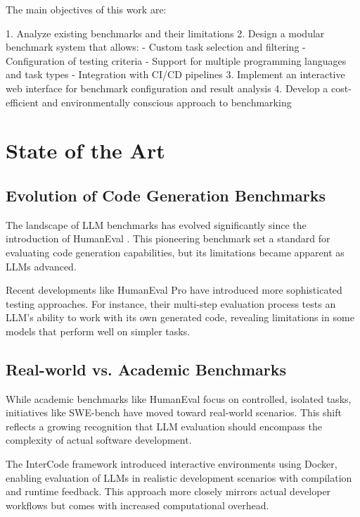 The main objectives of this work are:

1. Analyze existing benchmarks and their limitations
2. Design a modular benchmark system that allows:
   - Custom task selection and filtering
   - Configuration of testing criteria
   - Support for multiple programming languages and task types
   - Integration with CI/CD pipelines
3. Implement an interactive web interface for benchmark configuration and result analysis
4. Develop a cost-efficient and environmentally conscious approach to benchmarking

\chapter{State of the Art}

\section{Evolution of Code Generation Benchmarks}

The landscape of LLM benchmarks has evolved significantly since the introduction of HumanEval \cite{humaneval2021}. This pioneering benchmark set a standard for evaluating code generation capabilities, but its limitations became apparent as LLMs advanced.

Recent developments like HumanEval Pro \cite{humanevalprombpp2024} have introduced more sophisticated testing approaches. For instance, their multi-step evaluation process tests an LLM's ability to work with its own generated code, revealing limitations in some models that perform well on simpler tasks.

\section{Real-world vs. Academic Benchmarks}

While academic benchmarks like HumanEval focus on controlled, isolated tasks, initiatives like SWE-bench \cite{swebench2023} have moved toward real-world scenarios. This shift reflects a growing recognition that LLM evaluation should encompass the complexity of actual software development.

The InterCode framework \cite{intercode2023} introduced interactive environments using Docker, enabling evaluation of LLMs in realistic development scenarios with compilation and runtime feedback. This approach more closely mirrors actual developer workflows but comes with increased computational overhead.

